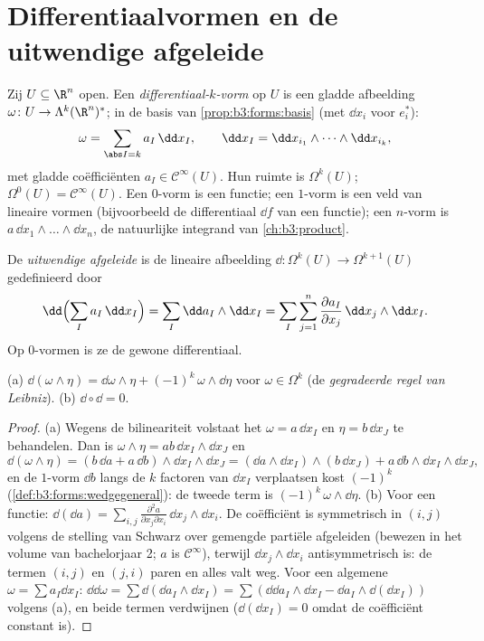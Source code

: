 \section{Differentiaalvormen en de uitwendige afgeleide}

\begin{definition}\label{def:b3:forms:diffform}
Zij $U \subseteq \R^n$ open. Een
\emph{differentiaal-$k$-vorm} op $U$ is
een gladde afbeelding $\omega\colon U \to \Lambda^k(\R^n)^*$; in
de basis van \cref{prop:b3:forms:basis} (met $\dd x_i$ voor
$e_i^*$):
\[
\omega = \sum_{\abs I = k} a_I\,\dd x_I,
\qquad
\dd x_I = \dd x_{i_1} \wedge \dots \wedge \dd x_{i_k},
\]
met gladde coëfficiënten $a_I \in \mathcal C^\infty(U)$. Hun
ruimte is $\Omega^k(U)$; $\Omega^0(U) = \mathcal C^\infty(U)$.
Een $0$-vorm is een functie; een $1$-vorm is een veld van
lineaire vormen (bijvoorbeeld de differentiaal $\dd f$ van een
functie); een $n$-vorm is $a\,\dd x_1\wedge\dots\wedge\dd x_n$,
de natuurlijke integrand van \cref{ch:b3:product}.
\end{definition}

\begin{definition}\label{def:b3:forms:d}
De \emph{uitwendige afgeleide} is de
lineaire afbeelding $\dd\colon \Omega^k(U) \to \Omega^{k+1}(U)$
gedefinieerd door
\[
\dd\Bigl(\sum_I a_I\,\dd x_I\Bigr)
= \sum_I \dd a_I \wedge \dd x_I
= \sum_I\sum_{j=1}^n \frac{\partial a_I}{\partial
x_j}\,\dd x_j \wedge \dd x_I .
\]
Op $0$-vormen is ze de gewone differentiaal.
\end{definition}

\begin{theorem}\label{thm:b3:forms:dsquare}
(a) $\dd(\omega \wedge \eta) = \dd\omega \wedge \eta +
(-1)^k\,\omega \wedge \dd\eta$ voor $\omega \in \Omega^k$ (de
\emph{gegradeerde regel van Leibniz}).
(b) $\dd \circ \dd = 0$.
\end{theorem}

\begin{proof}
(a) Wegens de bilineariteit volstaat het $\omega = a\,\dd x_I$ en
$\eta = b\,\dd x_J$ te behandelen. Dan is $\omega \wedge \eta =
ab\,\dd x_I \wedge \dd x_J$ en
\[
\dd(\omega\wedge\eta) = (b\,\dd a + a\,\dd b) \wedge \dd x_I
\wedge \dd x_J
= (\dd a \wedge \dd x_I) \wedge (b\,\dd x_J) +
a\,\dd b \wedge \dd x_I \wedge \dd x_J,
\]
en de $1$-vorm $\dd b$ langs de $k$ factoren van $\dd x_I$
verplaatsen kost $(-1)^k$
(\cref{def:b3:forms:wedgegeneral}): de tweede term is
$(-1)^k\,\omega \wedge \dd\eta$.
(b) Voor een functie: $\dd(\dd a) = \sum_{i,j}
\frac{\partial^2a}{\partial x_j\partial x_i}\,\dd x_j \wedge \dd
x_i$. De coëfficiënt is symmetrisch in $(i,j)$ volgens de
stelling van Schwarz over gemengde partiële afgeleiden (bewezen
in het volume van bachelorjaar 2; $a$ is $\mathcal C^\infty$),
terwijl $\dd x_j \wedge \dd x_i$ antisymmetrisch is: de termen
$(i,j)$ en $(j,i)$ paren en alles valt weg. Voor een algemene
$\omega = \sum a_I\dd x_I$: $\dd\dd\omega = \sum\dd(\dd a_I
\wedge \dd x_I) = \sum(\dd\dd a_I\wedge\dd x_I - \dd
a_I\wedge\dd(\dd x_I))$ volgens (a), en beide termen verdwijnen
($\dd(\dd x_I) = 0$ omdat de coëfficiënt constant is).
\end{proof}

